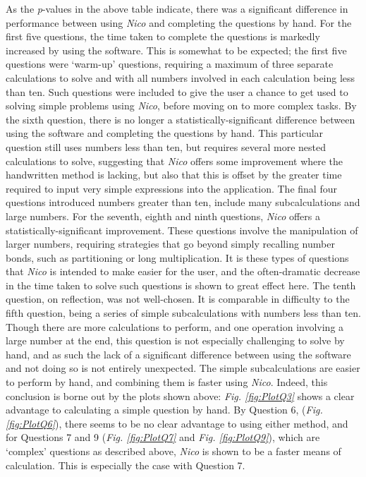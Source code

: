 \documentclass[12pt,twoside,notitlepage,xetex]{report}
\begin{document}
As the \emph{p}-values in the above table indicate, there was a significant
difference in performance between using \emph{Nico} and completing the
questions by hand.  For the first five questions, the time taken to complete
the questions is markedly increased by using the software.  This is somewhat to
be expected;  the first five questions were `warm-up' questions, requiring a
maximum of three separate calculations to solve and with all numbers involved
in each calculation being less than ten.  Such questions were included to give
the user a chance to get used to solving simple problems using \emph{Nico},
before moving on to more complex tasks.  By the sixth question, there is no
longer a statistically-significant difference between using the software and
completing the questions by hand.  This particular question still uses numbers
less than ten, but requires several more nested calculations to solve,
suggesting that \emph{Nico} offers some improvement where the handwritten
method is lacking, but also that this is offset by the greater time required to
input very simple expressions into the application.  The final four questions
introduced numbers greater than ten, include many subcalculations and large
numbers.  For the seventh, eighth and ninth questions, \emph{Nico} offers a
statistically-significant improvement.  These questions involve the
manipulation of larger numbers, requiring strategies that go beyond simply
recalling number bonds, such as partitioning or long multiplication.  It is
these types of questions that \emph{Nico} is intended to make easier for the
user, and the often-dramatic decrease in the time taken to solve such questions
is shown to great effect here.  The tenth question, on reflection, was not
well-chosen.  It is comparable in difficulty to the fifth question, being a
series of simple subcalculations with numbers less than ten.  Though there are
more calculations to perform, and one operation involving a large number at the
end,  this question is not especially challenging to solve by hand, and as such
the lack of a significant difference between using the software and not doing
so is not entirely unexpected.  The simple subcalculations are easier to
perform by hand, and combining them is faster using \emph{Nico}.  Indeed, this
conclusion is borne out by the plots shown above: \emph{Fig. \ref{fig:PlotQ3}} shows a clear advantage to calculating a simple question by hand.  By Question 6, (\emph{Fig. \ref{fig:PlotQ6}}), there seems to be no clear advantage to using either method, and for Questions 7 and 9 (\emph{Fig. \ref{fig:PlotQ7}} and \emph{Fig. \ref{fig:PlotQ9}}), which are `complex' questions as described above, \emph{Nico} is shown to be a faster means of calculation.  This is especially the case with Question 7.
\end{document}
